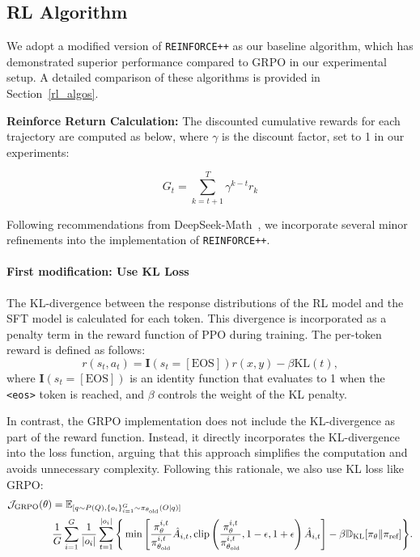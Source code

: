 \subsection{RL Algorithm}
We adopt a modified version of \texttt{REINFORCE++} as our baseline algorithm, which has demonstrated superior performance compared to GRPO in our experimental setup. A detailed comparison of these algorithms is provided in Section~\ref{rl_algos}. 

\textbf{Reinforce Return Calculation:} The discounted cumulative rewards for each trajectory are computed as below, where $\gamma$ is the discount factor, set to 1 in our experiments:

\begin{equation*}
G_t = \sum_{k=t+1}^{T} \gamma^{k-t} r_k
\end{equation*}


Following recommendations from DeepSeek-Math~\cite{grpo}, we incorporate several minor refinements into the implementation of \texttt{REINFORCE++}.

\paragraph{First modification: Use KL Loss}
 The KL-divergence between the response distributions of the RL model and the SFT model is calculated for each token. This divergence is incorporated as a penalty term in the reward function of PPO during training. The per-token reward is defined as follows:
\begin{equation*}
r(s_t, a_t) = \mathbf{I}(s_t = [\text{EOS}]) r(x, y) - \beta \text{KL}(t),
\end{equation*}
where $\mathbf{I}(s_t = [\text{EOS}])$ is an identity function that evaluates to 1 when the \texttt{<eos>} token is reached, and $\beta$ controls the weight of the KL penalty.

In contrast, the GRPO implementation does not include the KL-divergence as part of the reward function. Instead, it directly incorporates the KL-divergence into the loss function, arguing that this approach simplifies the computation and avoids unnecessary complexity. Following this rationale, we also use KL loss like GRPO:
\begin{align*}
    \mathcal{J}_{\text{GRPO}}(\theta) &= \mathbb{E}_{[q \sim P(Q), \{o_i\}_{i=1}^G \sim \pi_{\theta_{\text{old}}}(O|q)]} \notag \\
    &\frac{1}{G}\sum_{i=1}^G\frac{1}{\vert o_i\vert}\sum_{t=1}^{\vert o_i\vert}\Bigg\{\min\left[\frac{\pi_{\theta}^{i,t}}{\pi_{\theta_{\text{old}}}^{i,t}}\hat{A}_{i,t}, \textrm{clip}\left(\frac{\pi_{\theta}^{i,t}}{\pi_{\theta_{\text{old}}}^{i,t}}, 1-\epsilon, 1+\epsilon\right)\hat{A}_{i,t}\right] - \beta\mathbb{D}_{\text{KL}}[\pi_{\theta} \| \pi_{\text{ref}}]\Bigg\}.
\end{align*}


